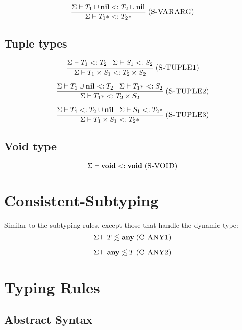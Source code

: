 \documentclass[12pt]{article}
\newcommand{\Any}{\mathbf{any}}
\newcommand{\Nil}{\mathbf{nil}}
\newcommand{\Void}{\mathbf{void}}
\newcommand{\mylabel}[1]{\; (\textsc{#1})}
\newcommand{\subtype}{<:}
\newcommand{\senv}{\Sigma}
\begin{document}
\[
\frac{\senv \vdash T_{1} \cup \Nil \subtype T_{2} \cup \Nil}
     {\senv \vdash T_{1}* \subtype T_{2}*}
\mylabel{S-VARARG}
\]

\subsection{Tuple types}

\[
\frac{\senv \vdash T_{1} \subtype T_{2} \;\;\;
      \senv \vdash S_{1} \subtype S_{2}}
     {\senv \vdash T_{1} \times S_{1} \subtype T_{2} \times S_{2}}
\mylabel{S-TUPLE1}
\]

\[
\frac{\senv \vdash T_{1} \cup \Nil \subtype T_{2} \;\;\;
      \senv \vdash T_{1}* \subtype S_{2}}
     {\senv \vdash T_{1}* \subtype T_{2} \times S_{2}}
\mylabel{S-TUPLE2}
\]

\[
\frac{\senv \vdash T_{1} \subtype T_{2} \cup \Nil \;\;\;
      \senv \vdash S_{1} \subtype T_{2}*}
     {\senv \vdash T_{1} \times S_{1} \subtype T_{2}*}
\mylabel{S-TUPLE3}
\]

\subsection{Void type}

\[
\senv \vdash \Void \subtype \Void
\mylabel{S-VOID}
\]

\section{Consistent-Subtyping}

Similar to the subtyping rules, except those that handle the dynamic type:
\[
\senv \vdash T \lesssim \Any
\mylabel{C-ANY1}
\]

\[
\senv \vdash \Any \lesssim T
\mylabel{C-ANY2}
\]

\section{Typing Rules}

\subsection{Abstract Syntax}
\end{document}
